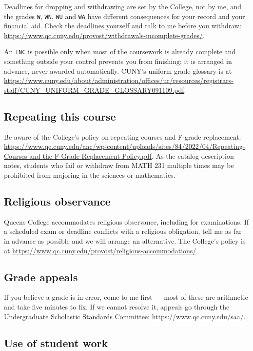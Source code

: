 \documentclass[11pt]{article}
\begin{document}
Deadlines for dropping and withdrawing are set by the College, not by me, and
the grades \texttt{W}, \texttt{WN}, \texttt{WU} and \texttt{WA} have different
consequences for your record and your financial aid. Check the deadlines
yourself and talk to me before you withdraw:
\url{https://www.qc.cuny.edu/provost/withdrawals-incomplete-grades/}.

An \texttt{INC} is possible only when most of the coursework is already complete
and something outside your control prevents you from finishing; it is arranged
in advance, never awarded automatically. CUNY's uniform grade glossary is at
\url{https://www.cuny.edu/about/administration/offices/ur/resources/registrars-staff/CUNY_UNIFORM_GRADE_GLOSSARY091109.pdf}.

\subsection{Repeating this course}

Be aware of the College's policy on repeating courses and F-grade replacement:
\url{https://www.qc.cuny.edu/aac/wp-content/uploads/sites/84/2022/04/Repeating-Courses-and-the-F-Grade-Replacement-Policy.pdf}.
As the catalog description notes, students who fail or withdraw from MATH 231
multiple times may be prohibited from majoring in the sciences or mathematics.

\subsection{Religious observance}

Queens College accommodates religious observance, including for examinations.
If a scheduled exam or deadline conflicts with a religious obligation, tell me
as far in advance as possible and we will arrange an alternative. The College's
policy is at \url{https://www.qc.cuny.edu/provost/religious-accommodations/}.

\subsection{Grade appeals}

If you believe a grade is in error, come to me first --- most of these are
arithmetic and take five minutes to fix. If we cannot resolve it, appeals go
through the Undergraduate Scholastic Standards Committee:
\url{https://www.qc.cuny.edu/saa/}.

\subsection{Use of student work}
\end{document}
